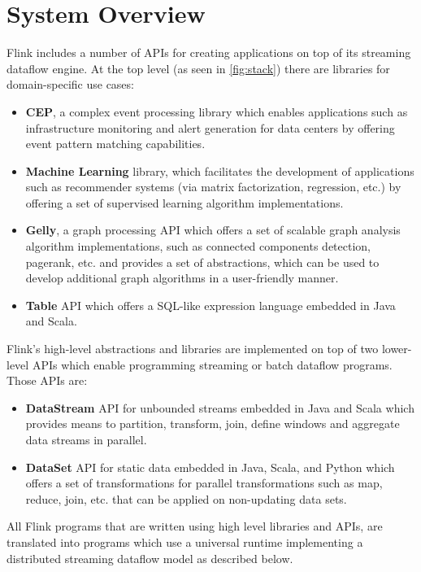 \documentclass{llncs}
\begin{document}
\section{System Overview}
\label{sec:overview}
Flink includes a number of APIs for creating applications on top of its streaming dataflow engine. At the top level (as seen in \autoref{fig:stack}) there are libraries for domain-specific use cases:
\begin{itemize}
\item \textbf{CEP}, a complex event processing library which enables applications such as infrastructure monitoring and alert generation for data centers by offering event pattern matching capabilities.
\item \textbf{Machine Learning} library, which facilitates the development of applications such as recommender systems (via matrix factorization, regression, etc.) by offering a set of supervised learning algorithm implementations.
\item \textbf{Gelly}, a graph processing API which offers a set of scalable graph analysis algorithm implementations, such as connected components detection, pagerank, etc. and provides a set of abstractions, which can be used to develop additional graph algorithms in a user-friendly manner.
\item \textbf{Table} API which offers a SQL-like expression language embedded in Java and Scala.
\end{itemize}

\noindent Flink's high-level abstractions and libraries are implemented on top of two lower-level APIs which enable programming streaming or batch dataflow programs. Those APIs are:
\begin{itemize}
    \item \textbf{DataStream} API for unbounded streams embedded in Java and Scala which provides means to partition, transform, join, define windows and aggregate data streams in parallel.
    \item \textbf{DataSet} API for static data embedded in Java, Scala, and Python which offers a set of transformations for parallel transformations such as map, reduce, join, etc. that can be applied on non-updating data sets.
\end{itemize}

All Flink programs that are written using high level libraries and APIs, are translated into programs which use a universal runtime implementing a distributed streaming dataflow model as described below.
\end{document}

